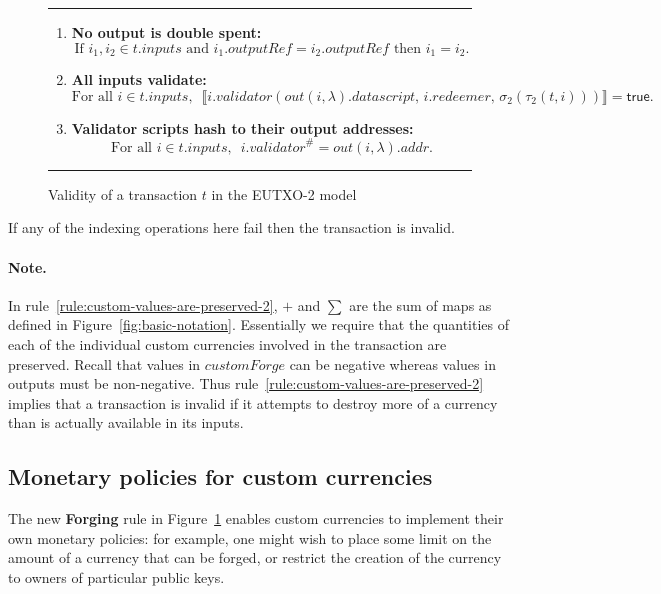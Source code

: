 \documentclass[a4paper]{article}
\theoremstyle{definition}  %
\newcommand\rfskip{7pt}
\newenvironment{ruledfigure}[1]{\begin{figure}[#1]\hrule\vspace{\rfskip}}{\vspace{\rfskip}\hrule\end{figure}}
\newcommand{\true}{\textsf{true}}
\newcommand{\mi}[1]{\ensuremath{\mathit{#1}}}
\newcommand{\inputs}{\mi{inputs}}
\newcommand{\addr}{\mi{addr}}
\newcommand{\customforge}{\mi{customForge}}
\newcommand{\validator}{\mi{validator}}
\newcommand{\redeemer}{\mi{redeemer}}
\newcommand{\datascript}{\mi{datascript}}
\newcommand{\txout}{\mi{out}}
\begin{document}
\begin{ruledfigure}{H}
\begin{enumerate}
\begin{minipage}{0.85\textwidth}
          \end{minipage}
    \item \label{rule:no-double-spending-2} \textbf{No output is double spent:}
    \[
     \textrm{If } i_1, i_2 \in t.\inputs \textrm{ and }  i_1.\mathit{outputRef} = i_2.\mathit{outputRef}
     \textrm{ then } i_1 = i_2.
    \]
    \item\label{rule:all-inputs-validate-2} \textbf{All inputs validate:}
    \[
    \textrm{For all } i \in t.\inputs,\enspace \llbracket
    i.\validator(\txout(i,\lambda).\datascript,\, i.\redeemer,\, \sigma_2(\tau_2(t, i)))
    \rrbracket = \true.
      \]
    \item\label{rule:validator-scripts-hash-2} \textbf{Validator scripts hash to their output addresses:}
    \[
      \textrm{For all } i \in t.\inputs,\enspace i.\validator^{\#} = \txout(i, \lambda).\addr.
    \]
  \end{enumerate}
  \caption{Validity of a transaction $t$ in the EUTXO-2 model}
  \label{fig:eutxo-2-validity}

\end{ruledfigure}

\noindent If any of the indexing operations here fail then the
transaction is invalid.

\paragraph{Note.} In rule~\ref{rule:custom-values-are-preserved-2},
$+$ and $\sum$ are the sum of maps as defined in
Figure~\ref{fig:basic-notation}. Essentially we require that the
quantities of each of the individual custom currencies involved in the
transaction are preserved.  Recall that values in $\customforge$ can
be negative whereas values in outputs must be non-negative.  Thus
rule~\ref{rule:custom-values-are-preserved-2} implies that a
transaction is invalid if it attempts to destroy more of a currency
than is actually available in its inputs.


\subsection{Monetary policies for custom currencies}
\label{sec:monetary-policies}
The new \textbf{Forging} rule in
Figure~\ref{fig:eutxo-2-validity} enables custom currencies to
implement their own monetary policies: for example, one might wish to
place some limit on the amount of a currency that can be forged, or
restrict the creation of the currency to owners of particular public
keys.
\end{document}
